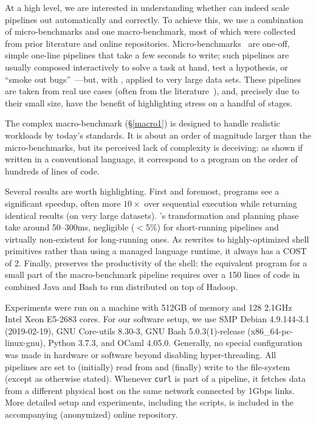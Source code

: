 \documentclass[sigplan,10pt,review,anonymous]{acmart}
\newcommand{\ttt}[1]{\texttt{\small #1}}
\newcommand{\wkq}{\ttt{q\textsubscript{1-4}}}
\newcommand{\todo}[1]{\hl{#1}\xspace}
\begin{document}
At a high level, we are interested in understanding whether \sys can indeed scale pipelines out automatically and correctly.
To achieve this, we use a combination of micro-benchmarks and one macro-benchmark, most of which were collected from prior literature and online repositories.
Micro-bench\-marks~ are one-off, simple one-line pipelines that take a few seconds to write;
  such pipelines are usually composed interactively to solve a task at hand, test a hypothesis, or ``smoke out bugs''~\cite{bentley1986literate}---but, with \sys, applied to very large data sets.
These pipelines are taken from real use cases (often from the literature~\cite{bentley1985spelling}), and, precisely due to their small size, have the benefit of highlighting stress on a handful of stages.

The complex macro-benchmark (\S\ref{macro1}) is designed to handle realistic workloads by today's standards.
It is about an order of magnitude larger than the micro-benchmarks, but its perceived lack of complexity is deceiving:
  as shown if written in a conventional language, it correspond to a program on the order of hundreds of lines of code.

Several results are worth highlighting.
First and foremost, programs see a significant speedup, often more $10\times$ over sequential execution  while returning identical results (on very large datasets).
\sys's transformation and planning phase take around 50--300ms, negligible ($<$5\%) for short-running pipelines and virtually non-existent for long-running ones.
As \sys rewrites to highly-optimized shell primitives rather than using a managed language runtime, it always has a COST~\cite{mcsherryscalability} of 2.
Finally, \sys preserves the productivity of the shell:
  the equivalent program for a small part of the macro-benchmark pipeline requires over a 150 lines of code in combined Java and Bash to run distributed on top of Hadoop.

Experiments were run on a %
 machine with 512GB of memory and 128 2.1GHz Intel Xeon E5-2683 cores.
For our software setup, we use SMP Debian 4.9.144-3.1 (2019-02-19), GNU Core-utils 8.30-3, GNU Bash 5.0.3(1)-release (x86\_64-pc-linux-gnu), Python 3.7.3, and OCaml 4.05.0.
Generally, no special configuration was made in hardware or software beyond disabling hyper-threading. %
All pipelines are set to (initially) read from and (finally) write to the file-system (except as otherwise stated).
Whenever \ttt{curl} is part of a pipeline, it fetches data from a different physical host on the same network connected by 1Gbps links.
More detailed setup and experiments, including the scripts, is included in the accompanying (anonymized) online repository.
\end{document}
